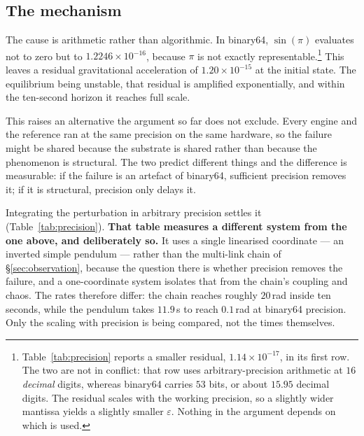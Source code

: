 \documentclass[review,12pt]{elsarticle}
\begin{document}
\subsection{The mechanism}\label{sec:precision}
The cause is arithmetic rather than algorithmic. In binary64, $\sin(\pi)$
evaluates not to zero but to $1.2246\times10^{-16}$, because $\pi$ is not
exactly representable.\footnote{Table~\ref{tab:precision} reports a smaller residual,
$1.14\times10^{-17}$, in its first row. The two are not in conflict: that row
uses arbitrary-precision arithmetic at $16$ \emph{decimal} digits, whereas
binary64 carries $53$ bits, or about $15.95$ decimal digits. The residual scales
with the working precision, so a slightly wider mantissa yields a slightly
smaller $\varepsilon$. Nothing in the argument depends on which is used.} This leaves a
residual gravitational acceleration of $1.20\times10^{-15}$ at the initial state. The equilibrium being unstable, that
residual is amplified exponentially, and within the ten-second horizon it
reaches full scale.

This raises an alternative the argument so far does not exclude. Every engine
and the reference ran at the same precision on the same hardware, so the failure
might be shared because the substrate is shared rather than because the
phenomenon is structural. The two predict different things and the difference
is measurable: if the failure is an artefact of binary64, sufficient precision
removes it; if it is structural, precision only delays it.

Integrating the perturbation in arbitrary precision settles it (Table~\ref{tab:precision}).
\textbf{That table measures a different system from the one above, and deliberately
so.} It uses a single linearised coordinate --- an inverted simple pendulum ---
rather than the multi-link chain of \S\ref{sec:observation}, because the question
there is whether precision removes the failure, and a one-coordinate system
isolates that from the chain's coupling and chaos. The rates therefore differ:
the chain reaches roughly $20$\,rad inside ten seconds, while the pendulum
takes $11.9$\,s to reach $0.1$\,rad at binary64 precision. Only the scaling
with precision is being compared, not the times themselves.
\end{document}
